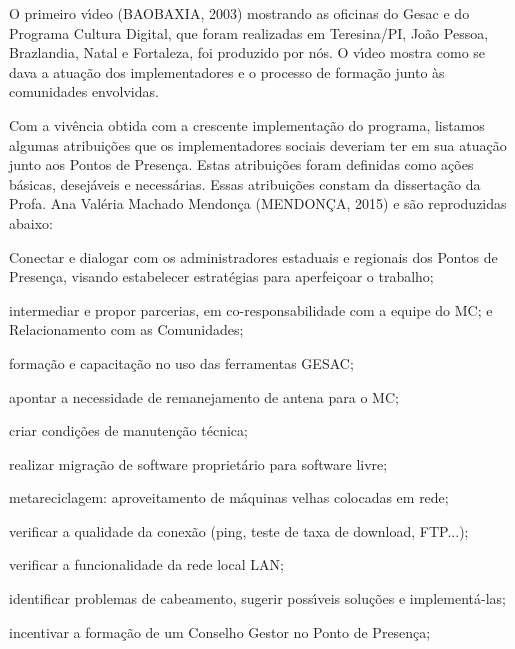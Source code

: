 \documentclass[
12pt,		%
openright,	%
twoside,  %
a4paper,			%
chapter=TITLE,		%
english,			%
french,				%
spanish,			%
brazil				%
]{USPSC-classe/USPSC}
\begin{document}
O primeiro v\'{\i}deo  (BAOBAXIA, 2003)  mostrando as oficinas do Gesac e do Programa Cultura Digital, que foram realizadas em Teresina/PI, Jo\~ao Pessoa, Brazlandia, Natal e Fortaleza, foi produzido por n\'os. O v\'{\i}deo mostra como se dava a atua\c{c}\~ao dos implementadores e o processo de forma\c{c}\~ao junto \`as comunidades envolvidas.










Com a viv\^encia obtida com a crescente implementa\c{c}\~ao do programa, listamos  algumas atribui\c{c}\~oes que os implementadores sociais deveriam ter em sua atua\c{c}\~ao junto aos Pontos de Presen\c{c}a. Estas atribui\c{c}\~oes foram definidas como a\c{c}\~oes b\'asicas, desej\'aveis e necess\'arias. Essas atribui\c{c}\~oes constam da disserta\c{c}\~ao da Profa. Ana Val\'eria Machado Mendon\c{c}a  (MENDON\c{C}A, 2015) e s\~ao reproduzidas abaixo:











\begin{alineas}
\item Conectar e dialogar com os administradores estaduais e regionais dos Pontos de Presen\c{c}a, visando estabelecer estrat\'egias para aperfei\c{c}oar o trabalho;
\item intermediar e propor parcerias, em co-responsabilidade com a equipe do MC; e Relacionamento com as Comunidades;
\item forma\c{c}\~ao e capacita\c{c}\~ao no uso das ferramentas GESAC;
\item apontar a  necessidade de remanejamento de antena para o MC;
\item criar condi\c{c}\~oes de manuten\c{c}\~ao t\'ecnica;
\item realizar migra\c{c}\~ao de software propriet\'ario para software livre;
\item metareciclagem: aproveitamento de m\'aquinas velhas colocadas em rede;
\item verificar a qualidade da conex\~ao (ping, teste de taxa de download, FTP...);
\item verificar a funcionalidade da rede local LAN;
\item identificar problemas de cabeamento, sugerir poss\'{\i}veis solu\c{c}\~oes e implement\'a-las;
\item incentivar a forma\c{c}\~ao de um Conselho Gestor no Ponto de Presen\c{c}a;
\end{alineas}
\end{document}
